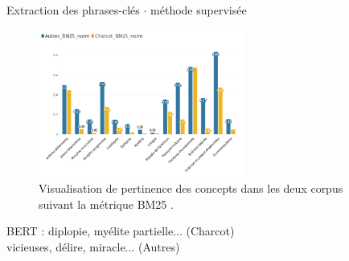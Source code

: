 \begin{frame}{Extraction des phrases-clés $\cdot$ méthode supervisée}
		        \begin{figure}[!h]
		\centering
		\includegraphics[width=0.6\textwidth]{pic/Charcot_Autres_250523.png}
		\caption{Visualisation de pertinence des concepts dans les deux corpus suivant la métrique \textsc{BM25} \citep{robertson1976relevance}.}
	\end{figure}
	\textsc{BERT} \citep{vaswani2023} : diplopie, myélite partielle$\dots$ (Charcot)\\
	\quad\quad\quad vicieuses, délire, miracle$\dots$ (Autres)
\end{frame}